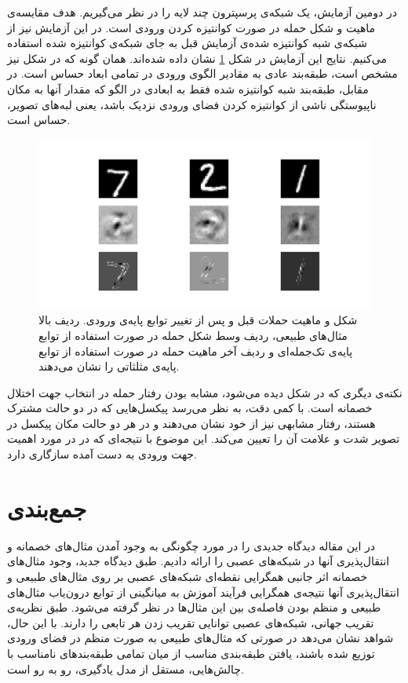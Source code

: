 \documentclass[12pt,onecolumn,a4paper]{article}
\begin{document}
در دومین آزمایش، یک شبکه‌ی پرسپترون چند لایه را در نظر می‌گیریم. هدف مقایسه‌ی ماهیت و شکل حمله در صورت کوانتیزه کردن ورودی است. در این آزمایش نیز از شبکه‌ی شبه کوانتیزه شده‌ی آزمایش قبل به جای شبکه‌ی کوانتیزه شده استفاده می‌کنیم. نتایج این آزمایش در شکل \ref{fig:shape} نشان داده شده‌اند. همان گونه که در شکل نیز مشخص است، طبقه‌بند عادی به مقادیر الگوی ورودی در تمامی ابعاد حساس است. در مقابل، طبقه‌بند شبه کوانتیزه شده فقط به ابعادی در الگو که مقدار آنها به مکان ناپیوستگی ناشی از کوانتیزه کردن فضای ورودی نزدیک باشد، یعنی لبه‌های تصویر، حساس است.

\begin{figure}[t]
	\centering
	\includegraphics[width=\linewidth]{shapeshift.png}
	\caption{شکل و ماهیت حملات قبل و پس از تغییر توابع پایه‌ی ورودی. ردیف بالا مثال‌های طبیعی، ردیف وسط شکل حمله در صورت استفاده از توابع پایه‌ی تک‌جمله‌ای و ردیف آخر ماهیت حمله در صورت استفاده از توابع پایه‌ی مثلثاتی را نشان می‌دهند.}
	\label{fig:shape}
\end{figure}

نکته‌ی دیگری که در شکل دیده می‌شود، مشابه بودن رفتار حمله در انتخاب جهت اختلال خصمانه است. با کمی دقت، به نظر می‌رسد پیکسل‌هایی که در دو حالت مشترک هستند، رفتار مشابهی نیز از خود نشان می‌دهند و در هر دو حالت مکان پیکسل در تصویر  شدت و علامت آن را تعیین می‌کند. این موضوع با نتیجه‌ای که در \cite{goodfellow2014explaining} در مورد اهمیت جهت ورودی به دست آمده سازگاری دارد.

\section{جمع‌بندی}
در این مقاله دیدگاه جدیدی را در مورد چگونگی به وجود آمدن مثال‌های خصمانه و انتقال‌پذیری آنها در شبکه‌های عصبی را ارائه دادیم. طبق دیدگاه جدید، وجود مثال‌های خصمانه اثر جانبی همگرایی نقطه‌ای شبکه‌های عصبی بر روی مثال‌های طبیعی و انتقال‌پذیری آنها نتیجه‌ی همگرایی فرآیند آموزش به میانگینی از توابع درون‌یاب مثال‌های طبیعی و منظم بودن فاصله‌ی بین این مثال‌ها در نظر گرفته می‌شود. طبق نظریه‌ی تقریب جهانی، شبکه‌های عصبی توانایی تقریب زدن هر تابعی را دارند. با این حال، شواهد نشان می‌دهد در صورتی که مثال‌های طبیعی به صورت منظم در فضای ورودی توزیع شده باشند، یافتن طبقه‌بندی مناسب از میان تمامی طبقه‌بندهای نامناسب با چالش‌هایی، مستقل از مدل یادگیری، رو به رو است.
\end{document}
